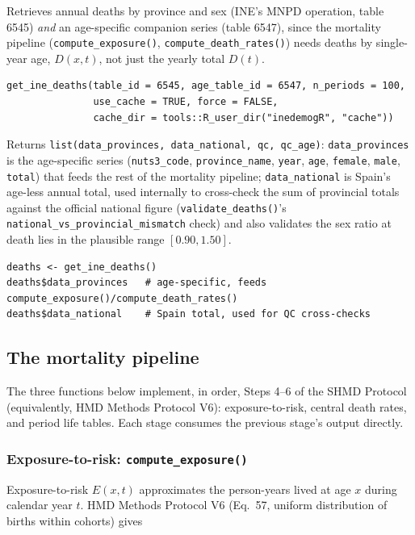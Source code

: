 \documentclass[11pt]{article}
\newcommand{\fn}[1]{\texttt{#1}}
\begin{document}
Retrieves annual deaths by province and sex (INE's MNPD operation, table
6545) \emph{and} an age-specific companion series (table 6547), since the
mortality pipeline (\fn{compute\_exposure()}, \fn{compute\_death\_rates()})
needs deaths by single-year age, $D(x,t)$, not just the yearly total
$D(t)$.

\begin{lstlisting}
get_ine_deaths(table_id = 6545, age_table_id = 6547, n_periods = 100,
               use_cache = TRUE, force = FALSE,
               cache_dir = tools::R_user_dir("inedemogR", "cache"))
\end{lstlisting}

Returns \fn{list(data\_provinces, data\_national, qc, qc\_age)}:
\fn{data\_provinces} is the age-specific series
(\fn{nuts3\_code}, \fn{province\_name}, \fn{year}, \fn{age}, \fn{female},
\fn{male}, \fn{total}) that feeds the rest of the mortality pipeline;
\fn{data\_national} is Spain's age-less annual total, used internally to
cross-check the sum of provincial totals against the official national
figure (\fn{validate\_deaths()}'s \fn{national\_vs\_provincial\_mismatch}
check) and also validates the sex ratio at death lies in the plausible
range $[0.90, 1.50]$.

\begin{lstlisting}
deaths <- get_ine_deaths()
deaths$data_provinces   # age-specific, feeds compute_exposure()/compute_death_rates()
deaths$data_national    # Spain total, used for QC cross-checks
\end{lstlisting}

\subsection{The mortality pipeline}

The three functions below implement, in order, Steps 4--6 of the SHMD
Protocol (equivalently, HMD Methods Protocol V6): exposure-to-risk, central
death rates, and period life tables. Each stage consumes the previous
stage's output directly.

\subsubsection{Exposure-to-risk: \fn{compute\_exposure()}}

Exposure-to-risk $E(x,t)$ approximates the person-years lived at age $x$
during calendar year $t$. HMD Methods Protocol V6 (Eq.~57, uniform
distribution of births within cohorts) gives
\end{document}
